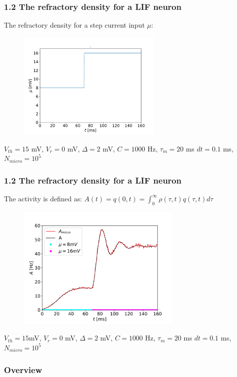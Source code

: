 \documentclass{beamer}
\begin{document}

\begin{frame}
\frametitle{1.2 The refractory density for a LIF neuron}
\small{The refractory density for a step current input $\mu$:}
\begin{figure}
	\centering
		\includegraphics[width=70mm]{mu}
\end{figure}
\small{$V_{th}=15$ mV, $V_r=0$ mV, $\Delta = 2$ mV, $C=1000$ Hz, $\tau_m=20$ ms $dt=0.1$ ms, $N_{micro}=10^5$}
\end{frame}




\begin{frame}
\frametitle{1.2 The refractory density for a LIF neuron}
The activity is defined as:
$A(t)=q(0,t)=\int_{0}^{\infty}\rho(\tau,t)q(\tau,t)d\tau$

	\begin{figure}
	\centering
	\includegraphics[width=8cm]{At_first}\   
\end{figure}

\small{$V_{th}=15$mV, $V_r=0$ mV, $\Delta = 2$ mV, $C=1000$ Hz, $\tau_m=20$ ms $dt=0.1$ ms, $N_{micro}=10^5$}

\end{frame}

\begin{frame}
\frametitle{Overview}%
\tableofcontents %
\end{frame}
\end{document}

